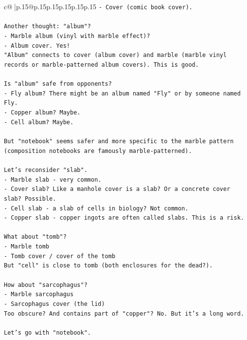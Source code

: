 \documentclass{article}
\begin{document}
{\begin{supertabular}{c@{$\;$}|p{.15\linewidth}@{}p{.15\linewidth}p{.15\linewidth}p{.15\linewidth}p{.15\linewidth}p{.15\linewidth}}
{{{\texttt{{-} Cover (comic book cover).} \\
\\ 
\texttt{Another thought: "album"?} \\
\texttt{{-} Marble album (vinyl with marble effect)?} \\
\texttt{{-} Album cover. Yes!} \\
\texttt{"Album" connects to cover (album cover) and marble (marble vinyl records or marble{-}patterned album covers). This is good.} \\
\\ 
\texttt{Is "album" safe from opponents?} \\
\texttt{{-} Fly album? There might be an album named "Fly" or by someone named Fly.} \\
\texttt{{-} Copper album? Maybe.} \\
\texttt{{-} Cell album? Maybe.} \\
\\ 
\texttt{But "notebook" seems safer and more specific to the marble pattern (composition notebooks are famously marble{-}patterned).} \\
\\ 
\texttt{Let's reconsider "slab".} \\
\texttt{{-} Marble slab {-} very common.} \\
\texttt{{-} Cover slab? Like a manhole cover is a slab? Or a concrete cover slab? Possible.} \\
\texttt{{-} Cell slab {-} a slab of cells in biology? Not common.} \\
\texttt{{-} Copper slab {-} copper ingots are often called slabs. This is a risk.} \\
\\ 
\texttt{What about "tomb"?} \\
\texttt{{-} Marble tomb} \\
\texttt{{-} Tomb cover / cover of the tomb} \\
\texttt{But "cell" is close to tomb (both enclosures for the dead?).} \\
\\ 
\texttt{How about "sarcophagus"?} \\
\texttt{{-} Marble sarcophagus} \\
\texttt{{-} Sarcophagus cover (the lid)} \\
\texttt{Too obscure? And contains part of "copper"? No. But it's a long word.} \\
\\ 
\texttt{Let's go with "notebook".} \\
}}}
\end{supertabular}}
\end{document}
